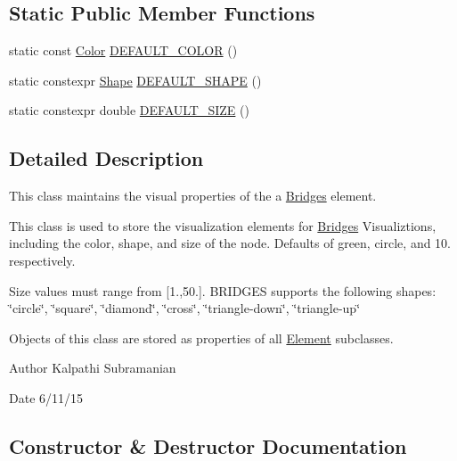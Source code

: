 \subsection*{Static Public Member Functions}
\begin{DoxyCompactItemize}
\item 
static const \mbox{\hyperlink{classbridges_1_1_color}{Color}} \mbox{\hyperlink{classbridges_1_1_element_visualizer_af86eb415ef765943472952ba49f7163d}{D\+E\+F\+A\+U\+L\+T\+\_\+\+C\+O\+L\+OR}} ()
\item 
static constexpr \mbox{\hyperlink{namespacebridges_a1b4050586bd708782ae0d4f3b06b9579}{Shape}} \mbox{\hyperlink{classbridges_1_1_element_visualizer_a79c6eef0e43bdd61b9292053dfe45f29}{D\+E\+F\+A\+U\+L\+T\+\_\+\+S\+H\+A\+PE}} ()
\item 
static constexpr double \mbox{\hyperlink{classbridges_1_1_element_visualizer_a3e21ee8df1c6c3f22a8c631894344413}{D\+E\+F\+A\+U\+L\+T\+\_\+\+S\+I\+ZE}} ()
\end{DoxyCompactItemize}


\subsection{Detailed Description}
This class maintains the visual properties of the a \mbox{\hyperlink{classbridges_1_1_bridges}{Bridges}} element. 

This class is used to store the visualization elements for \mbox{\hyperlink{classbridges_1_1_bridges}{Bridges}} Visualiztions, including the color, shape, and size of the node. Defaults of green, circle, and 10. respectively.

Size values must range from \mbox{[}1.,50.\mbox{]}. B\+R\+I\+D\+G\+ES supports the following shapes\+: \char`\"{}circle\char`\"{}, \char`\"{}square\char`\"{}, \char`\"{}diamond\char`\"{}, \char`\"{}cross\char`\"{}, \char`\"{}triangle-\/down\char`\"{}, \char`\"{}triangle-\/up\char`\"{}

Objects of this class are stored as properties of all \mbox{\hyperlink{classbridges_1_1_element}{Element}} subclasses.

\begin{DoxyAuthor}{Author}
Kalpathi Subramanian 
\end{DoxyAuthor}
\begin{DoxyDate}{Date}
6/11/15 
\end{DoxyDate}


\subsection{Constructor \& Destructor Documentation}
\mbox{\label{classbridges_1_1_element_visualizer_addcc19a2f7fd51dcc7aebfdabb882886}} 

